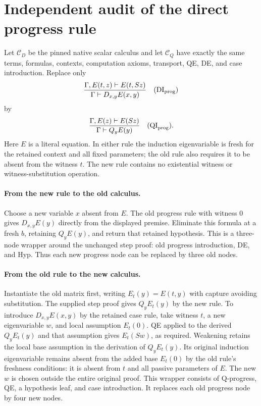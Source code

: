 \section{Independent audit of the direct progress rule}

Let $\mathcal C_D$ be the pinned native scalar calculus and let
$\mathcal C_Q$ have exactly the same terms, formulas, contexts, computation
axioms, transport, QE, DE, and case introduction. Replace only
\[
 \frac{\Gamma,E(t,z)\vdash E(t,Sz)}
      {\Gamma\vdash D_{x,y}E(x,y)}
 \quad(\mathrm{DI}_{\rm prog})
\]
by
\[
 \frac{\Gamma,E(z)\vdash E(Sz)}
      {\Gamma\vdash Q_yE(y)}
 \quad(\mathrm{QI}_{\rm prog}).
\]
Here $E$ is a literal equation. In either rule the induction eigenvariable
is fresh for the retained context and all fixed parameters; the old rule
also requires it to be absent from the witness $t$. The new rule contains
no existential witness or witness-substitution operation.

\paragraph{From the new rule to the old calculus.}
Choose a new variable $x$ absent from $E$. The old progress rule with
witness $0$ gives $D_{x,y}E(y)$ directly from the displayed premise.
Eliminate this formula at a fresh $b$, retaining $Q_yE(y)$, and return that
retained hypothesis. This is a three-node wrapper around the unchanged
step proof: old progress introduction, DE, and Hyp. Thus each new progress
node can be replaced by three old nodes.

\paragraph{From the old rule to the new calculus.}
Instantiate the old matrix first, writing $E_t(y)=E(t,y)$ with capture
avoiding substitution. The supplied step proof gives $Q_yE_t(y)$ by the
new rule. To introduce $D_{x,y}E(x,y)$ by the retained case rule, take
witness $t$, a new eigenvariable $w$, and local assumption $E_t(0)$.
QE applied to the derived $Q_yE_t(y)$ and that assumption gives
$E_t(Sw)$, as required. Weakening retains the local base assumption in the
derivation of $Q_yE_t(y)$. Its original induction eigenvariable remains
absent from the added base $E_t(0)$ by the old rule's freshness conditions:
it is absent from $t$ and all passive parameters of $E$. The new $w$ is
chosen outside the entire original proof. This wrapper consists of Q-progress,
QE, a hypothesis leaf, and case introduction. It replaces each old
progress node by four new nodes.

